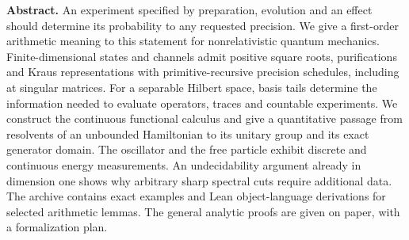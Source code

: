 \documentclass[11pt,letterpaper]{article}
\theoremstyle{definition}\newtheorem{definition}[theorem]{Definition}\newtheorem{example}[theorem]{Example}\newtheorem{remark}[theorem]{Remark}
\begin{document}
\thispagestyle{plain}
\par\vspace{1em}
\vspace{.7em}\par
\vspace{.6em}\par\vspace{1em}
\noindent\textbf{Abstract.} An experiment specified by preparation, evolution and an effect should determine its probability to any requested precision. We give a first-order arithmetic meaning to this statement for nonrelativistic quantum mechanics. Finite-dimensional states and channels admit positive square roots, purifications and Kraus representations with primitive-recursive precision schedules, including at singular matrices. For a separable Hilbert space, basis tails determine the information needed to evaluate operators, traces and countable experiments. We construct the continuous functional calculus and give a quantitative passage from resolvents of an unbounded Hamiltonian to its unitary group and its exact generator domain. The oscillator and the free particle exhibit discrete and continuous energy measurements. An undecidability argument already in dimension one shows why arbitrary sharp spectral cuts require additional data. The archive contains exact examples and Lean object-language derivations for selected arithmetic lemmas. The general analytic proofs are given on paper, with a formalization plan.
\vspace{.25em}\begingroup\setlength{\parskip}{0pt}\tableofcontents\endgroup\newpage










\end{document}
